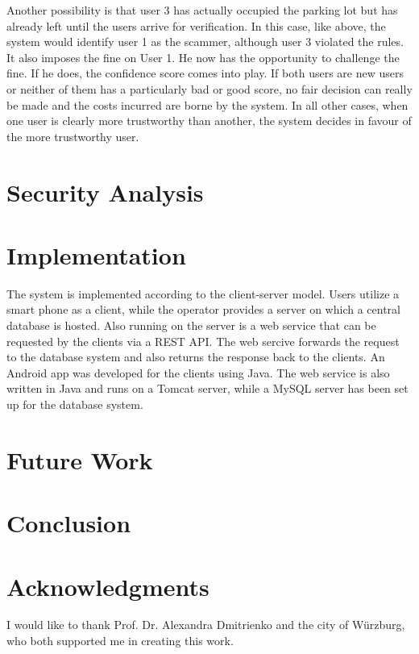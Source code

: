 \documentclass[
a4paper,     %
titlepage,   %
14pt         %
]{scrartcl}  %
\theoremstyle{mystyle}
\begin{document}
Another possibility is that user 3 has actually occupied the parking lot but has already left until the users arrive for verification. In this case, like above, the system would identify user 1 as the scammer, although user 3 violated the rules. It also imposes the fine on User 1. He now has the opportunity to challenge the fine. If he does, the confidence score comes into play. If both users are new users or neither of them has a particularly bad or good score, no fair decision can really be made and the costs incurred are borne by the system. In all other cases, when one user is clearly more trustworthy than another, the system decides in favour of the more trustworthy user.


\section{Security Analysis}

\section{Implementation}
The system is implemented according to the client-server model. Users utilize a smart phone as a client, while the operator provides a server on which a central database is hosted. Also running on the server is a web service that can be requested by the clients via a REST API. The web sercive forwards the request to the database system and also returns the response back to the clients. An Android app was developed for the clients using Java. The web service is also written in Java and runs on a Tomcat server, while a MySQL server has been set up for the database system.

\section{Future Work}

\section{Conclusion}

\section{Acknowledgments}
I would like to thank Prof. Dr. Alexandra Dmitrienko and the city of Würzburg, who both supported me in creating this work.
\end{document}
